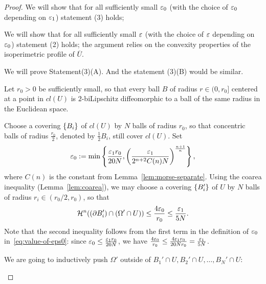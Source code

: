 \begin{lemma}
\begin{proof}
        We will show that for all sufficiently small $\varepsilon_0$ (with the choice of $\varepsilon_0$ depending on $\varepsilon_1$) statement (3) holds;  

        We will show that for all sufficiently small $\varepsilon$ (with the choice of $\varepsilon$ depending on $\varepsilon_0$) statement (2) holds; the argument relies on the convexity properties of the isoperimetric profile of $\overline{U}$.

        We will prove Statement(3)(A). And the statement (3)(B) would be similar.

        Let $r_0 > 0$ be sufficiently small, so that every ball $B$ of radius $r \in (0, r_0]$ centered at a point in $cl(U)$ is $2$-biLipschitz diffeomorphic to a ball of the same radius in the Euclidean space.

        Choose a covering $\left\{B_i\right\}$ of $cl(U)$ by $N$ balls of radius $r_0$, so that concentric balls of radius $\frac{r_0}{2}$, denoted by $\frac{1}{2}B_i$, still cover $cl(U)$. Set
        \begin{equation}\label{eq:value-of-eps0}
            \varepsilon_0 := \min\left\{\frac{\varepsilon_1 r_0}{20 N}, \left(\frac{\varepsilon_1}{2^{n + 2}C(n)N}\right)^{\frac{n + 1}{n}}\right\},
        \end{equation}
        where $C(n)$ is the constant from Lemma~\ref{lem:morse-separate}. Using the coarea inequality (Lemma~\ref{lem:coarea}), we may choose a covering $\left\{B_i'\right\}$ of $U$ by $N$ balls of radius $r_i \in (r_0/2, r_0)$, so that         \begin{equation}\label{eq:area-of-Bi}
            \mathcal{H}^n((\partial B_i')\cap(\Omega'\cap U)) \leq \frac{4\varepsilon_0}{r_0} \leq \frac{\varepsilon_1}{5N}.
        \end{equation}
        Note that the second inequality follows from the first term in the definition of $\varepsilon_0$ in~\eqref{eq:value-of-eps0}: since $\varepsilon_0 \leq \frac{\varepsilon_1 r_0}{20N}$, we have $\frac{4\varepsilon_0}{r_0} \leq \frac{4\varepsilon_1 r_0}{20Nr_0} = \frac{\varepsilon_1}{5N}$.

        We are going to inductively push $\Omega'$ outside of $B_1'\cap U, B_2'\cap U ,\dots, B_N'\cap U$:
        \begin{figure}[htbp]
            \centering
\end{figure}
\end{proof}
\end{lemma}
